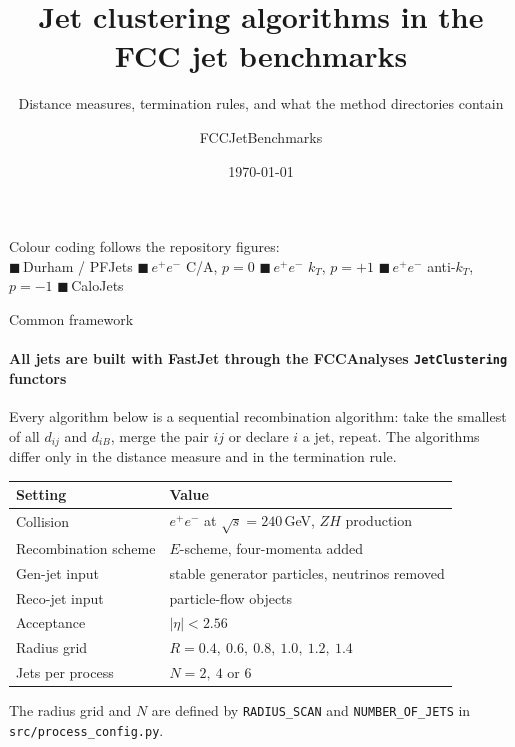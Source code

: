 \documentclass[aspectratio=169,10pt]{beamer}
\title{Jet clustering algorithms in the FCC jet benchmarks}
\subtitle{Distance measures, termination rules, and what the method directories contain}
\author{FCCJetBenchmarks}
\date{\today}
\newcommand{\ee}{$e^{+}e^{-}$}
\newcommand{\dij}{d_{ij}}
\newcommand{\diB}{d_{iB}}
\begin{document}
\begin{frame}[plain]
  \titlepage
  \begin{center}\footnotesize
    Colour coding follows the repository figures:\\[4pt]
    \textcolor{pfblue}{$\blacksquare$}\,Durham / PFJets \quad
    \textcolor{caviolet}{$\blacksquare$}\,\ee{} C/A, $p=0$ \quad
    \textcolor{ktamberink}{$\blacksquare$}\,\ee{} $k_T$, $p=+1$ \quad
    \textcolor{aktteal}{$\blacksquare$}\,\ee{} anti-$k_T$, $p=-1$ \quad
    \textcolor{calogreen}{$\blacksquare$}\,CaloJets
  \end{center}
\end{frame}

\begin{frame}{Common framework}
  \framesubtitle{All jets are built with FastJet through the FCCAnalyses \texttt{JetClustering} functors}

  Every algorithm below is a sequential recombination algorithm: take the
  smallest of all $\dij$ and $\diB$, merge the pair $ij$ or declare $i$ a jet,
  repeat. The algorithms differ only in the distance measure and in the
  termination rule.

  \medskip
  \begin{center}
  \small
  \begin{tabular}{@{}ll@{}}
    \toprule
    Setting & Value \\
    \midrule
    Collision & \ee{} at $\sqrt{s} = 240$\,GeV, $ZH$ production \\
    Recombination scheme & $E$-scheme, four-momenta added \\
    Gen-jet input & stable generator particles, neutrinos removed \\
    Reco-jet input & particle-flow objects \\
    Acceptance & $|\eta| < 2.56$ \\
    Radius grid & $R = 0.4,\ 0.6,\ 0.8,\ 1.0,\ 1.2,\ 1.4$ \\
    Jets per process & $N = 2,\ 4$ or $6$ \\
    \bottomrule
  \end{tabular}
  \end{center}

  \medskip
  The radius grid and $N$ are defined by \texttt{RADIUS\_SCAN} and
  \texttt{NUMBER\_OF\_JETS} in \texttt{src/process\_config.py}.
\end{frame}
\end{document}
